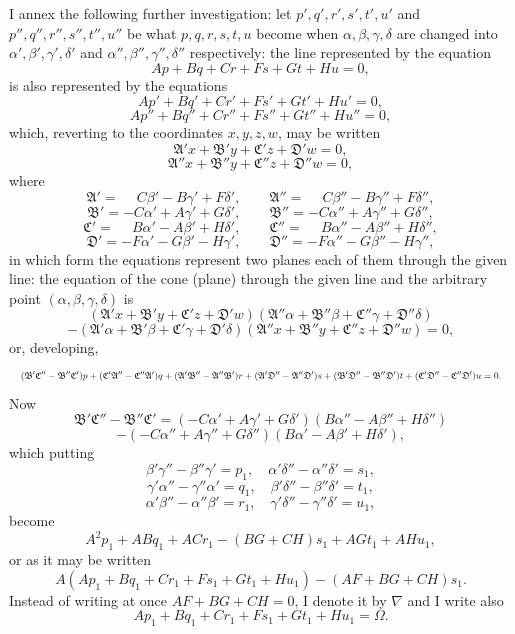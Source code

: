 \documentclass[11pt]{article}
\begin{document}
I annex the following further investigation: let $p',q',r',s',t',u'$ and
$p'',q'',r'',s'',t'',u''$ be what $p,q,r,s,t,u$ become when $\alpha,\beta,\gamma,\delta$
are changed into $\alpha',\beta',\gamma',\delta'$ and $\alpha'',\beta'',\gamma'',\delta''$
respectively: the line represented by the equation
\[ Ap+Bq+Cr+Fs+Gt+Hu=0, \]
is also represented by the equations
\[ Ap'+Bq'+Cr'+Fs'+Gt'+Hu'=0, \]
\[ Ap''+Bq''+Cr''+Fs''+Gt''+Hu''=0, \]
which, reverting to the coordinates $x,y,z,w$, may be written
\[ \mathfrak{A}'x+\mathfrak{B}'y+\mathfrak{C}'z+\mathfrak{D}'w=0, \]
\[ \mathfrak{A}''x+\mathfrak{B}''y+\mathfrak{C}''z+\mathfrak{D}''w=0, \]
where
\[ \mathfrak{A}'=\phantom{-}C\beta'-B\gamma'+F\delta',\qquad \mathfrak{A}''=\phantom{-}C\beta''-B\gamma''+F\delta'', \]
\[ \mathfrak{B}'=-C\alpha'+A\gamma'+G\delta',\qquad \mathfrak{B}''=-C\alpha''+A\gamma''+G\delta'', \]
\[ \mathfrak{C}'=\phantom{-}B\alpha'-A\beta'+H\delta',\qquad \mathfrak{C}''=\phantom{-}B\alpha''-A\beta''+H\delta'', \]
\[ \mathfrak{D}'=-F\alpha'-G\beta'-H\gamma',\qquad \mathfrak{D}''=-F\alpha''-G\beta''-H\gamma'', \]
in which form the equations represent two planes each of them through the given
line: the equation of the cone (plane) through the given line and the arbitrary
point $(\alpha,\beta,\gamma,\delta)$ is
\[ (\mathfrak{A}'x+\mathfrak{B}'y+\mathfrak{C}'z+\mathfrak{D}'w)(\mathfrak{A}''\alpha+\mathfrak{B}''\beta+\mathfrak{C}''\gamma+\mathfrak{D}''\delta) \]
\[ -(\mathfrak{A}'\alpha+\mathfrak{B}'\beta+\mathfrak{C}'\gamma+\mathfrak{D}'\delta)(\mathfrak{A}''x+\mathfrak{B}''y+\mathfrak{C}''z+\mathfrak{D}''w)=0, \]
or, developing,
\[ \resizebox{\textwidth}{!}{$\displaystyle
(\mathfrak{B}'\mathfrak{C}''-\mathfrak{B}''\mathfrak{C}')p+(\mathfrak{C}'\mathfrak{A}''-\mathfrak{C}''\mathfrak{A}')q+(\mathfrak{A}'\mathfrak{B}''-\mathfrak{A}''\mathfrak{B}')r+(\mathfrak{A}'\mathfrak{D}''-\mathfrak{A}''\mathfrak{D}')s+(\mathfrak{B}'\mathfrak{D}''-\mathfrak{B}''\mathfrak{D}')t+(\mathfrak{C}'\mathfrak{D}''-\mathfrak{C}''\mathfrak{D}')u=0.
$} \]
Now
\[ \mathfrak{B}'\mathfrak{C}''-\mathfrak{B}''\mathfrak{C}'=(-C\alpha'+A\gamma'+G\delta')(B\alpha''-A\beta''+H\delta'') \]
\[ -(-C\alpha''+A\gamma''+G\delta'')(B\alpha'-A\beta'+H\delta'), \]
which putting
\[ \beta'\gamma''-\beta''\gamma'=p_{1},\quad \alpha'\delta''-\alpha''\delta'=s_{1}, \]
\[ \gamma'\alpha''-\gamma''\alpha'=q_{1},\quad \beta'\delta''-\beta''\delta'=t_{1}, \]
\[ \alpha'\beta''-\alpha''\beta'=r_{1},\quad \gamma'\delta''-\gamma''\delta'=u_{1}, \]
become
\[ A^{2}p_{1}+ABq_{1}+ACr_{1}-(BG+CH)s_{1}+AGt_{1}+AHu_{1}, \]
or as it may be written
\[ A(Ap_{1}+Bq_{1}+Cr_{1}+Fs_{1}+Gt_{1}+Hu_{1})-(AF+BG+CH)s_{1}. \]
Instead of writing at once $AF+BG+CH=0$, I denote it by $\nabla$ and I write also
\[ Ap_{1}+Bq_{1}+Cr_{1}+Fs_{1}+Gt_{1}+Hu_{1}=\Omega. \]
\end{document}
